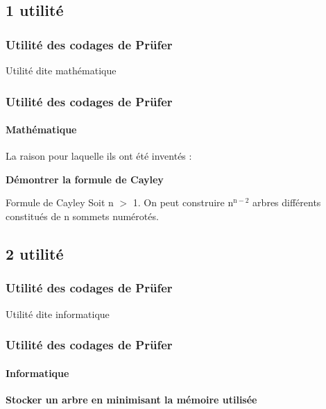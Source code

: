 \documentclass[11pt]{beamer}
\begin{document}
\subsection{1\iere{} utilité}
\begin{frame}
\end{frame}

\begin{frame}
\frametitle{Utilité des codages de Prüfer}

\begin{center}
\LARGE{Utilité dite mathématique}
\end{center}

\end{frame}

\begin{frame}
\frametitle{Utilité des codages de Prüfer}
\framesubtitle{Mathématique}

La raison pour laquelle ils ont été inventés :\\
\vspace{0.3cm}
\begin{center}
\textbf{Démontrer la formule de Cayley}
\end{center}
\pause
\vspace{0.2cm}
\begin{block}{Formule de Cayley}
Soit n $>$ 1. On peut construire n$^{\text{n}-2}$ arbres différents constitués de n sommets numérotés.
\end{block}

\end{frame}

\subsection{2\ieme{} utilité}
\begin{frame}
\end{frame}

\begin{frame}
\frametitle{Utilité des codages de Prüfer}

\begin{center}
\LARGE{Utilité dite informatique}
\end{center}

\end{frame}

\begin{frame}
\frametitle{Utilité des codages de Prüfer}
\framesubtitle{Informatique}

\begin{center}
\textbf{Stocker un arbre en minimisant la mémoire utilisée}
\end{center}
\end{frame}
\end{document}

